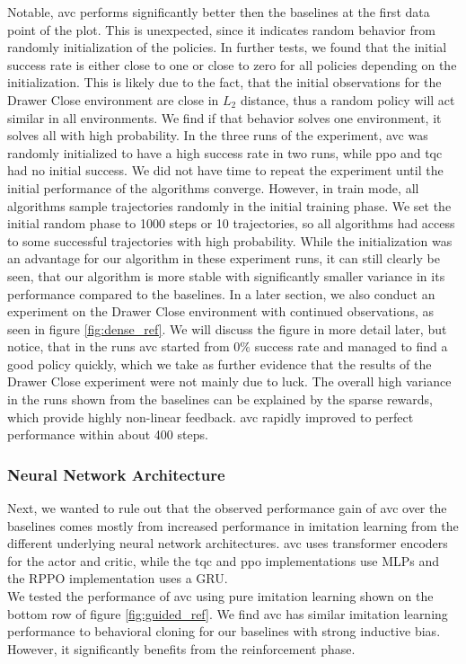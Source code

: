 Notable, \ac{avc} performs significantly better then the baselines at the first data point of the plot. This is unexpected, since it indicates 
random behavior from randomly initialization of the policies. In further tests, we found that the initial success rate is either close to one or close to zero for all policies depending 
on the initialization. This is likely 
due to the fact, that the initial observations for the Drawer Close environment are close in $L_2$ distance, thus a random policy will act similar in all environments. We find if that behavior 
solves one environment, it solves all with high probability. In the three runs of the experiment, \ac{avc} was randomly initialized to have a high success rate in two runs, while \ac{ppo} and \ac{tqc} had no 
initial success. We did not have time to repeat the experiment until the initial performance of the algorithms converge. However, in train mode, 
all algorithms sample trajectories randomly in the initial training phase. 
We set the initial random phase to 1000 steps or 10 trajectories, so all algorithms had access to some successful trajectories with high probability. While the initialization was an advantage 
for our algorithm in these experiment runs, it can still clearly be seen, that our algorithm is more stable with significantly smaller variance in its performance compared to the baselines. In a later 
section, we also conduct an experiment on the Drawer Close environment with continued observations, as seen in figure \ref{fig:dense_ref}. We will discuss the figure in more detail later, but 
notice, that in the runs \ac{avc} started from $0 \%$ success rate and managed to find a good policy quickly, which we take as further evidence that the results of the Drawer Close experiment were not 
mainly due to luck. The overall high variance in the runs shown from the baselines can be explained by the sparse rewards, which provide highly non-linear feedback. 
\ac{avc} rapidly improved to perfect performance within about 400 steps. \\

\subsubsection{Neural Network Architecture}
Next, we wanted to rule out that the observed performance gain of \ac{avc} over the baselines comes mostly from increased performance in imitation learning 
from the different underlying neural network architectures. \ac{avc} uses transformer encoders for the actor and 
critic, while the \ac{tqc} and \ac{ppo} implementations use MLPs and the RPPO implementation uses a GRU.\\ 
We tested the performance of \ac{avc} using pure imitation learning shown on the bottom row of
figure \ref{fig:guided_ref}. We find \ac{avc} has similar imitation learning performance to behavioral cloning for our baselines with strong inductive bias. However, it significantly benefits from the reinforcement phase.\\

